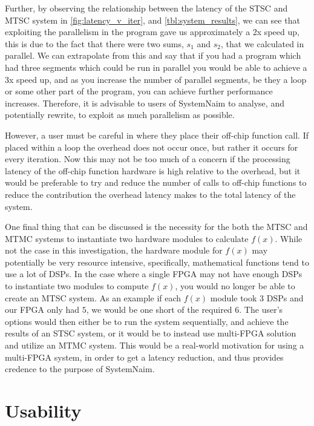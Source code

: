 Further, by observing the relationship between the latency of the STSC and MTSC system in \autoref{fig:latency_v_iter}, and \autoref{tbl:system_results}, we can see that exploiting the parallelism in the program gave us approximately a 2x speed up, this is due to the fact that there were two sums, $s_1$ and $s_2$, that we calculated in parallel. We can extrapolate from this and say that if you had a program which had three segments which could be run in parallel you would be able to achieve a 3x speed up, and as you increase the number of parallel segments, be they a loop or some other part of the program, you can achieve further performance increases. Therefore, it is advisable to users of SystemNaim to analyse, and potentially rewrite, to exploit as much parallelism as possible.

However, a user must be careful in where they place their off-chip function call. If placed within a loop the overhead does not occur once, but rather it occurs for every iteration. Now this may not be too much of a concern if the processing latency of the off-chip function hardware is high relative to the overhead, but it would be preferable to try and reduce the number of calls to off-chip functions to reduce the contribution the overhead latency makes to the total latency of the system.

One final thing that can be discussed is the necessity for the both the MTSC and MTMC systems to instantiate two hardware modules to calculate $f(x)$. While not the case in this investigation, the hardware module for $f(x)$ may potentially be very resource intensive, specifically, mathematical functions tend to use a lot of DSPs. In the case where a single FPGA may not have enough DSPs to instantiate two modules to compute $f(x)$, you would no longer be able to create an MTSC system. As an example if each $f(x)$ module took 3 DSPs and our FPGA only had $5$, we would be one short of the required $6$. The user's options would then either be to run the system sequentially, and achieve the results of an STSC system, or it would be to instead use multi-FPGA solution and utilize an MTMC system. This would be a real-world motivation for using a multi-FPGA system, in order to get a latency reduction, and thus provides credence to the purpose of SystemNaim.



\section{Usability}
\label{sec:usability}

